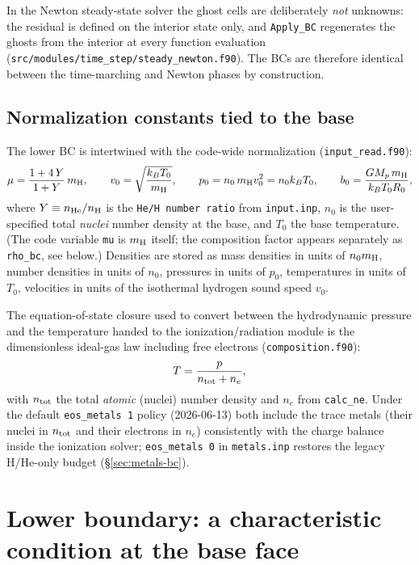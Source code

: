 \documentclass[english,a4paper]{my_memo}
\begin{document}
In the Newton steady-state solver the ghost cells are deliberately
\emph{not} unknowns: the residual is defined on the interior state
only, and \texttt{Apply\_BC} regenerates the ghosts from the interior
at every function evaluation
(\texttt{src/modules/time\_step/steady\_newton.f90}). The BCs are
therefore identical between the time-marching and Newton phases by
construction.

\subsection{Normalization constants tied to the base}
\label{sec:normalization}

The lower BC is intertwined with the code-wide normalization
(\texttt{input\_read.f90}):
\begin{equation}
\mu = \frac{1 + 4\,Y}{1 + Y}\, m_{\rm H}, \qquad
v_0 = \sqrt{\frac{k_B T_0}{m_{\rm H}}}, \qquad
p_0 = n_0\, m_{\rm H} v_0^2 = n_0 k_B T_0, \qquad
b_0 = \frac{G M_p\, m_{\rm H}}{k_B T_0 R_0},
\end{equation}
where $Y \equiv n_{\rm He}/n_{\rm H}$ is the \texttt{He/H number
ratio} from \texttt{input.inp}, $n_0$ is the user-specified total
\emph{nuclei} number density at the base, and $T_0$ the base
temperature. (The code variable \texttt{mu} is $m_{\rm H}$ itself;
the composition factor appears separately as \texttt{rho\_bc}, see
below.) Densities are stored as mass densities in units of
$n_0 m_{\rm H}$, number densities in units of $n_0$, pressures in
units of $p_0$, temperatures in units of $T_0$, velocities in units of
the isothermal hydrogen sound speed $v_0$.

The equation-of-state closure used to convert between the hydrodynamic
pressure and the temperature handed to the ionization/radiation module
is the dimensionless ideal-gas law including free electrons
(\texttt{composition.f90}):
\begin{equation}
T = \frac{p}{n_{\rm tot} + n_e},
\label{eq:eos}
\end{equation}
with $n_{\rm tot}$ the total \emph{atomic} (nuclei) number density and
$n_e$ from \texttt{calc\_ne}. Under the default \texttt{eos\_metals 1}
policy (2026-06-13) both include the trace metals (their nuclei in
$n_{\rm tot}$ and their electrons in $n_e$) consistently with the
charge balance inside the ionization solver; \texttt{eos\_metals 0} in
\texttt{metals.inp} restores the legacy H/He-only budget
(\S\ref{sec:metals-bc}).

\section{Lower boundary: a characteristic condition at the base face}
\label{sec:lower}
\end{document}
